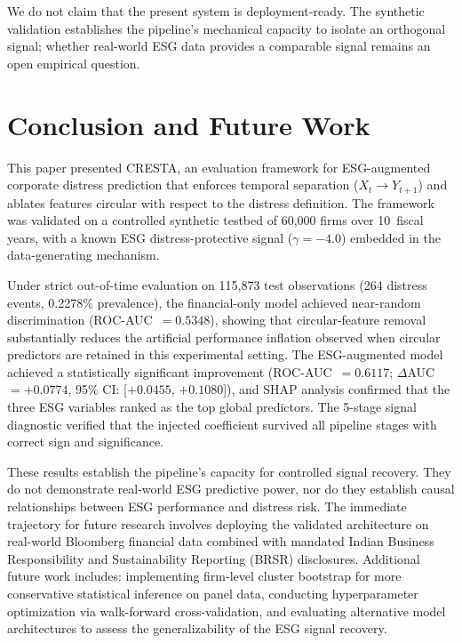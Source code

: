 \documentclass[sigconf,anonymous]{acmart}
\begin{document}
We do not claim that the present system is deployment-ready. The synthetic validation establishes the pipeline's mechanical capacity to isolate an orthogonal signal; whether real-world ESG data provides a comparable signal remains an open empirical question.


\section{Conclusion and Future Work}

This paper presented CRESTA, an evaluation framework for ESG-augmented corporate distress prediction that enforces temporal separation ($X_t \to Y_{t+1}$) and ablates features circular with respect to the distress definition. The framework was validated on a controlled synthetic testbed of 60,000 firms over 10~fiscal years, with a known ESG distress-protective signal ($\gamma = -4.0$) embedded in the data-generating mechanism.

Under strict out-of-time evaluation on 115,873 test observations (264 distress events, 0.2278\% prevalence), the financial-only model achieved near-random discrimination (ROC-AUC~$= 0.5348$), showing that circular-feature removal substantially reduces the artificial performance inflation observed when circular predictors are retained in this experimental setting. The ESG-augmented model achieved a statistically significant improvement (ROC-AUC~$= 0.6117$; $\Delta$AUC~$= +0.0774$, 95\% CI: [$+0.0455$, $+0.1080$]), and SHAP analysis confirmed that the three ESG variables ranked as the top global predictors. The 5-stage signal diagnostic verified that the injected coefficient survived all pipeline stages with correct sign and significance.

These results establish the pipeline's capacity for controlled signal recovery. They do not demonstrate real-world ESG predictive power, nor do they establish causal relationships between ESG performance and distress risk. The immediate trajectory for future research involves deploying the validated architecture on real-world Bloomberg financial data combined with mandated Indian Business Responsibility and Sustainability Reporting (BRSR) disclosures. Additional future work includes: implementing firm-level cluster bootstrap for more conservative statistical inference on panel data, conducting hyperparameter optimization via walk-forward cross-validation, and evaluating alternative model architectures to assess the generalizability of the ESG signal recovery.
\end{document}
